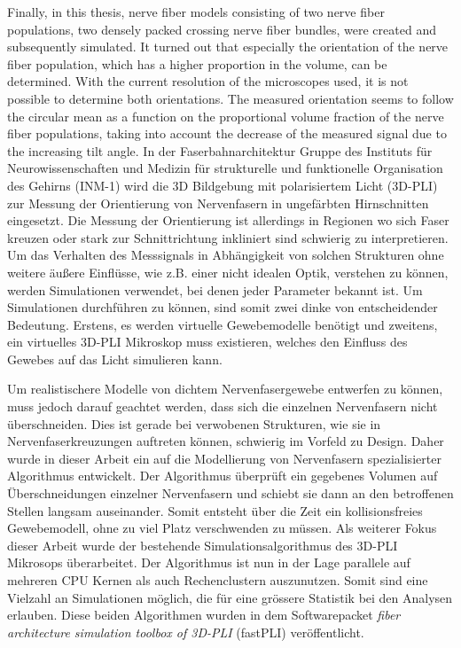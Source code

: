 Finally, in this thesis, nerve fiber models consisting of two nerve fiber populations, two densely packed crossing nerve fiber bundles, were created and subsequently simulated.
It turned out that especially the orientation of the nerve fiber population, which has a higher proportion in the volume, can be determined.
With the current resolution of the microscopes used, it is not possible to determine both orientations.
The measured orientation seems to follow the circular mean as a function on the proportional volume fraction of the nerve fiber populations, taking into account the decrease of the measured signal due to the increasing tilt angle.
% 
% 
% 
% 
In der Faserbahnarchitektur Gruppe des Instituts für Neurowissenschaften und Medizin für strukturelle und funktionelle Organisation des Gehirns (INM-1) wird die 3D Bildgebung mit polarisiertem Licht (3D-PLI) zur Messung der Orientierung von Nervenfasern in ungefärbten Hirnschnitten eingesetzt.
Die Messung der Orientierung ist allerdings in Regionen wo sich Faser kreuzen oder stark zur Schnittrichtung inkliniert sind schwierig zu interpretieren.
Um das Verhalten des Messsignals in Abhängigkeit von solchen Strukturen ohne weitere äußere Einflüsse, wie z.B. einer nicht idealen Optik, verstehen zu können, werden Simulationen verwendet, bei denen jeder Parameter bekannt ist.
Um Simulationen durchführen zu können, sind somit zwei dinke von entscheidender Bedeutung.
Erstens, es werden virtuelle Gewebemodelle benötigt und zweitens, ein virtuelles 3D-PLI Mikroskop muss existieren, welches den Einfluss des Gewebes auf das Licht simulieren kann. 

Um realistischere Modelle von dichtem Nervenfasergewebe entwerfen zu können, muss jedoch darauf geachtet werden, dass sich die einzelnen Nervenfasern nicht überschneiden.
Dies ist gerade bei verwobenen Strukturen, wie sie in Nervenfaserkreuzungen auftreten können, schwierig im Vorfeld zu Design.
Daher wurde in dieser Arbeit ein auf die Modellierung von Nervenfasern spezialisierter Algorithmus entwickelt.
Der Algorithmus überprüft ein gegebenes Volumen auf Überschneidungen einzelner Nervenfasern und schiebt sie dann an den betroffenen Stellen langsam auseinander.
Somit entsteht über die Zeit ein kollisionsfreies Gewebemodell, ohne zu viel Platz verschwenden zu müssen.
Als weiterer Fokus dieser Arbeit wurde der bestehende Simulationsalgorithmus des 3D-PLI Mikrosops überarbeitet.
Der Algorithmus ist nun in der Lage parallele auf mehreren CPU Kernen als auch Rechenclustern auszunutzen.
Somit sind eine Vielzahl an Simulationen möglich, die für eine grössere Statistik bei den Analysen erlauben.
Diese beiden Algorithmen wurden in dem Softwarepacket \textit{fiber architecture simulation toolbox of 3D-PLI} (fastPLI) veröffentlicht. 

